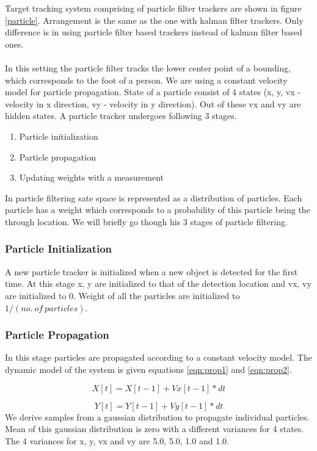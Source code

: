 \documentclass[12pt,a4paper]{report}
\begin{document}
Target tracking system comprising of particle filter trackers are shown in figure \ref{particle}. Arrangement is the same as the one with kalman filter trackers. Only difference is in using particle filter based trackers instead of kalman filter based ones.\\\\
In this setting the particle filter tracks the lower center point of a bounding, which corresponds to the foot of a person. We are using a constant velocity model for particle propagation.  State of a particle consist of 4 states (x, y, vx - velocity in x direction, vy - velocity in y direction). Out of these vx and vy are hidden states. A particle tracker undergoes following 3 stages.
\begin{enumerate}
\item Particle initialization
\item Particle propagation
\item Updating weights with a measurement
\end{enumerate}
In particle filtering sate space is represented as a distribution of particles. Each particle has a weight which corresponds to a probability of this particle being the through location. We will briefly go though his 3 stages of particle filtering.

\subsubsection{Particle Initialization}

A new particle tracker is initialized when a new object is detected for the first time. At this stage x, y are initialized to that of the detection location and vx, vy are initialized to 0. Weight of all the particles are initialized to $1/(no.\ of\ particles)$.

\subsubsection{Particle Propagation}

In this stage particles are propagated according to a constant velocity model. The dynamic model of the system is given equations \ref{eqn:prop1} and \ref{eqn:prop2}.

\begin{equation}
\label{eqn:prop1}
X[t] = X[t-1] + Vx[t-1] * dt
\end{equation}

\begin{equation}
\label{eqn:prop2}
Y[t] = Y[t-1] + Vy[t-1] * dt
\end{equation}
We derive samples from a gaussian distribution to propagate individual particles. Mean of this gaussian distribution is zero with a different variances for 4 states. The 4 variances for x, y, vx and vy are 5.0, 5.0, 1.0 and 1.0.
\end{document}
